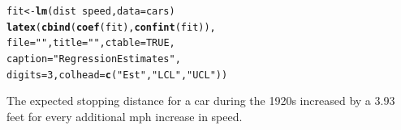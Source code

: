\documentclass[t]{beamer}\usepackage[]{graphicx}\usepackage[]{color}
\makeatletter
\newcommand{\hlnum}[1]{\textcolor[rgb]{0.686,0.059,0.569}{#1}}%
\newcommand{\hlstr}[1]{\textcolor[rgb]{0.192,0.494,0.8}{#1}}%
\newcommand{\hlopt}[1]{\textcolor[rgb]{0,0,0}{#1}}%
\newcommand{\hlstd}[1]{\textcolor[rgb]{0.345,0.345,0.345}{#1}}%
\newcommand{\hlkwb}[1]{\textcolor[rgb]{0.69,0.353,0.396}{#1}}%
\newcommand{\hlkwc}[1]{\textcolor[rgb]{0.333,0.667,0.333}{#1}}%
\newcommand{\hlkwd}[1]{\textcolor[rgb]{0.737,0.353,0.396}{\textbf{#1}}}%
\newenvironment{kframe}{%
 \def\at@end@of@kframe{}%
 \ifinner\ifhmode%
  \def\at@end@of@kframe{\end{minipage}}%
  \begin{minipage}{\columnwidth}%
 \fi\fi%
 \def\FrameCommand##1{\hskip\@totalleftmargin \hskip-\fboxsep
 \colorbox{shadecolor}{##1}\hskip-\fboxsep
     \hskip-\linewidth \hskip-\@totalleftmargin \hskip\columnwidth}%
 \MakeFramed {\advance\hsize-\width
   \@totalleftmargin\z@ \linewidth\hsize
   \@setminipage}}%
 {\par\unskip\endMakeFramed%
 \at@end@of@kframe}
\makeatother
\begin{document}
\begin{frame}[fragile]
\begin{kframe}
\begin{alltt}
\hlstd{fit} \hlkwb{<-} \hlkwd{lm}\hlstd{(dist} \hlopt{~} \hlstd{speed,} \hlkwc{data} \hlstd{= cars)}
\hlkwd{latex}\hlstd{(}\hlkwd{cbind}\hlstd{(}\hlkwd{coef}\hlstd{(fit),} \hlkwd{confint}\hlstd{(fit)),}
      \hlkwc{file} \hlstd{=} \hlstr{""}\hlstd{,} \hlkwc{title} \hlstd{=} \hlstr{""}\hlstd{,} \hlkwc{ctable} \hlstd{=} \hlnum{TRUE}\hlstd{,}
      \hlkwc{caption} \hlstd{=} \hlstr{"Regression Estimates"}\hlstd{,}
      \hlkwc{digits} \hlstd{=} \hlnum{3}\hlstd{,} \hlkwc{colhead} \hlstd{=} \hlkwd{c}\hlstd{(}\hlstr{"Est"}\hlstd{,} \hlstr{"LCL"}\hlstd{,} \hlstr{"UCL"}\hlstd{))}
\end{alltt}
\end{kframe}%
%


  The expected stopping distance for a car during the 1920s increased by a
  3.93 feet for every additional mph increase in
  speed.
\end{frame}
\end{document}
